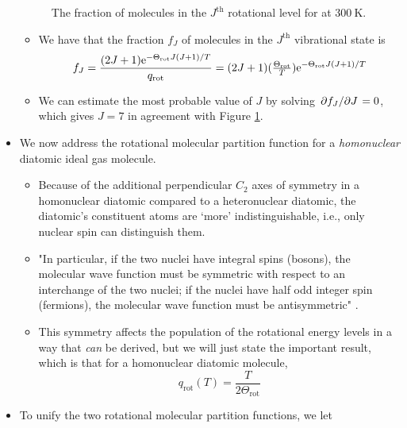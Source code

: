 \documentclass[../notes.tex]{subfiles}
\begin{document}
\begin{itemize}
\begin{figure}[h!]
        \caption{The fraction of molecules in the $J^\text{th}$ rotational level for  at $\SI{300}{\kelvin}$.}
        \label{fig:rotationalPopulations}
    \end{figure}
    \begin{itemize}
        \item We have that the fraction $f_J$ of molecules in the $J^\text{th}$ vibrational state is
        \begin{equation*}
            f_J = \frac{(2J+1)\e[-\Theta_\text{rot}J(J+1)/T]}{q_\text{rot}} = (2J+1)(\tfrac{\Theta_\text{rot}}{T})\e[-\Theta_\text{rot}J(J+1)/T]
        \end{equation*}
        \item We can estimate the most probable value of $J$ by solving $\pdv*{f_J}{J}=0$, which gives $J=7$ in agreement with Figure \ref{fig:rotationalPopulations}.
    \end{itemize}
    \item {}We now address the rotational molecular partition function for a \emph{homonuclear} diatomic ideal gas molecule.
    \begin{itemize}
        \item Because of the additional perpendicular $C_2$ axes of symmetry in a homonuclear diatomic compared to a heteronuclear diatomic, the diatomic's constituent atoms are `more' indistinguishable, i.e., only nuclear spin can distinguish them.
        \item "In particular, if the two nuclei have integral spins (bosons), the molecular wave function must be symmetric with respect to an interchange of the two nuclei; if the nuclei have half odd integer spin (fermions), the molecular wave function must be antisymmetric" \parencite[747]{bib:McQuarrieSimon}.
        \item This symmetry affects the population of the rotational energy levels in a way that \emph{can} be derived, but we will just state the important result, which is that for a homonuclear diatomic molecule,
        \begin{equation*}
            q_\text{rot}(T) = \frac{T}{2\Theta_\text{rot}}
        \end{equation*}
    \end{itemize}
    \item To unify the two rotational molecular partition functions, we let

\end{itemize}
\end{document}
